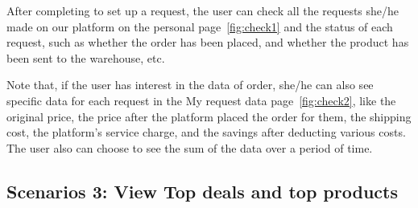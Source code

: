 After completing to set up a request, the user can check all the requests she/he made on our platform on the personal page~\ref{fig:check1} and the status of each request, such as whether the order has been placed, and whether the product has been sent to the warehouse, etc.

Note that, if the user has interest in the data of order, she/he can also see specific data for each request in the My request data page~\ref{fig:check2}, like the original price, the price after the platform placed the order for them, the shipping cost, the platform's service charge, and the savings after deducting various costs. The user also can choose to see the sum of the data over a period of time.

\subsection{Scenarios 3: View Top deals and top products}

